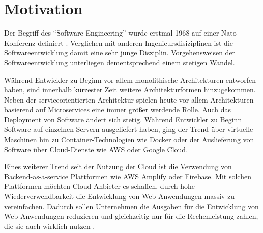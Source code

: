 \section{Motivation}

Der Begriff des "`Software Engineering"' wurde erstmal 1968 auf einer Nato-Konferenz definiert \autocite{naur1969software}. Verglichen mit anderen Ingenieursdisiziplinen ist die Softwareentwicklung damit eine sehr junge Disziplin. Vorgehensweisen der Softwareentwicklung unterliegen dementsprechend einem stetigen Wandel.

Während Entwickler zu Beginn vor allem monolithische Architekturen entworfen haben, sind innerhalb kürzester Zeit weitere Architekturformen hinzugekommen. Neben der serviceorientierten Architektur spielen heute vor allem Architekturen basierend auf Microservices eine immer größer werdende Rolle. Auch das Deployment von Software ändert sich stetig. Während Entwickler zu Beginn Software auf einzelnen Servern ausgeliefert haben, ging der Trend über virtuelle Maschinen hin zu Container-Technologien wie Docker oder der Auslieferung von Software über Cloud-Dienste wie \ac{AWS} oder Google Cloud.

Eines weiterer Trend seit der Nutzung der Cloud ist die Verwendung von Backend-as-a-service Plattformen wie \ac{AWS} Amplify oder Firebase. Mit solchen Plattformen möchten Cloud-Anbieter es schaffen, durch hohe Wiederverwendbarkeit die Entwicklung von Web-Anwendungen massiv zu vereinfachen. Dadurch sollen Unternehmen die Ausgaben für die Entwicklung von Web-Anwendungen reduzieren und gleichzeitig nur für die Rechenleistung zahlen, die sie auch wirklich nutzen \autocite{villamizar2017cost}.